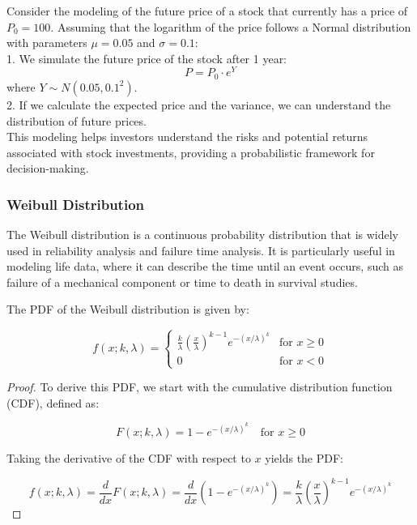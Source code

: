 \begin{example}
    Consider the modeling of the future price of a stock that currently has a price of $P_0 = 100$. Assuming that the logarithm of the price follows a Normal distribution with parameters \( \mu = 0.05 \) and \( \sigma = 0.1 \):\\

1. We simulate the future price of the stock after 1 year:
\[
P = P_0 \cdot e^{Y}
\]
where \( Y \sim N(0.05, 0.1^2) \).\\

2. If we calculate the expected price and the variance, we can understand the distribution of future prices.\\

This modeling helps investors understand the risks and potential returns associated with stock investments, providing a probabilistic framework for decision-making.
\end{example}

\subsubsection{Weibull Distribution}

The Weibull distribution is a continuous probability distribution that is widely used in reliability analysis and failure time analysis. It is particularly useful in modeling life data, where it can describe the time until an event occurs, such as failure of a mechanical component or time to death in survival studies.\\

\begin{definition}
    The PDF of the Weibull distribution is given by:

\[
f(x; k, \lambda) = 
\begin{cases} 
\frac{k}{\lambda} \left( \frac{x}{\lambda} \right)^{k-1} e^{-(x/\lambda)^{k}} & \text{for } x \geq 0 \\
0 & \text{for } x < 0 
\end{cases}
\]
\end{definition}

\begin{proof}
    To derive this PDF, we start with the cumulative distribution function (CDF), defined as:

\[
F(x; k, \lambda) = 1 - e^{-(x/\lambda)^{k}} \quad \text{for } x \geq 0
\]

Taking the derivative of the CDF with respect to $x$ yields the PDF:

\[
f(x; k, \lambda) = \frac{d}{dx} F(x; k, \lambda) = \frac{d}{dx} \left( 1 - e^{-(x/\lambda)^{k}} \right) = \frac{k}{\lambda} \left( \frac{x}{\lambda} \right)^{k-1} e^{-(x/\lambda)^{k}}
\]
\end{proof}

